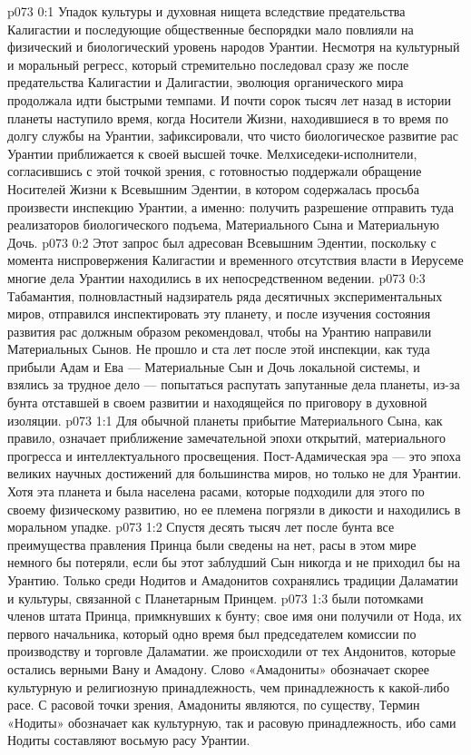 \author{Солония}
\vs p073 0:1 Упадок культуры и духовная нищета вследствие предательства Калигастии и последующие общественные беспорядки мало повлияли на физический и биологический уровень народов Урантии. Несмотря на культурный и моральный регресс, который стремительно последовал сразу же после предательства Калигастии и Далигастии, эволюция органического мира продолжала идти быстрыми темпами. И почти сорок тысяч лет назад в истории планеты наступило время, когда Носители Жизни, находившиеся в то время по долгу службы на Урантии, зафиксировали, что чисто биологическое развитие рас Урантии приближается к своей высшей точке. Мелхиседеки\hyp{}исполнители, согласившись с этой точкой зрения, с готовностью поддержали обращение Носителей Жизни к Всевышним Эдентии, в котором содержалась просьба произвести инспекцию Урантии, а именно: получить разрешение отправить туда реализаторов биологического подъема, Материального Сына и Материальную Дочь.
\vs p073 0:2 Этот запрос был адресован Всевышним Эдентии, поскольку с момента ниспровержения Калигастии и временного отсутствия власти в Иерусеме многие дела Урантии находились в их непосредственном ведении.
\vs p073 0:3 Табамантия, полновластный надзиратель ряда десятичных экспериментальных миров, отправился инспектировать эту планету, и после изучения состояния развития рас должным образом рекомендовал, чтобы на Урантию направили Материальных Сынов. Не прошло и ста лет после этой инспекции, как туда прибыли Адам и Ева --- Материальные Сын и Дочь локальной системы, и взялись за трудное дело --- попытаться распутать запутанные дела планеты, из\hyp{}за бунта отставшей в своем развитии и находящейся по приговору в духовной изоляции.
\vs p073 1:1 Для обычной планеты прибытие Материального Сына, как правило, означает приближение замечательной эпохи открытий, материального прогресса и интеллектуального просвещения. Пост\hyp{}Адамическая эра --- это эпоха великих научных достижений для большинства миров, но только не для Урантии. Хотя эта планета и была населена расами, которые подходили для этого по своему физическому развитию, но ее племена погрязли в дикости и находились в моральном упадке.
\vs p073 1:2 Спустя десять тысяч лет после бунта все преимущества правления Принца были сведены на нет, расы в этом мире немного бы потеряли, если бы этот заблудший Сын никогда и не приходил бы на Урантию. Только среди Нодитов и Амадонитов сохранялись традиции Даламатии и культуры, связанной с Планетарным Принцем.
\vs p073 1:3  были потомками членов штата Принца, примкнувших к бунту; свое имя они получили от Нода, их первого начальника, который одно время был председателем комиссии по производству и торговле Даламатии.  же происходили от тех Андонитов, которые остались верными Вану и Амадону. Слово «Амадониты» обозначает скорее культурную и религиозную принадлежность, чем принадлежность к какой\hyp{}либо расе. С расовой точки зрения, Амадониты являются, по существу,  Термин «Нодиты» обозначает как культурную, так и расовую принадлежность, ибо сами Нодиты составляют восьмую расу Урантии.
